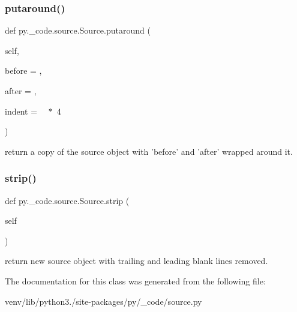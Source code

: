 \subsubsection{\texorpdfstring{putaround()}{putaround()}}
{\footnotesize\ttfamily def py.\+\_\+code.\+source.\+Source.\+putaround (\begin{DoxyParamCaption}\item[{}]{self,  }\item[{}]{before = {\ttfamily \textquotesingle{}\textquotesingle{}},  }\item[{}]{after = {\ttfamily \textquotesingle{}\textquotesingle{}},  }\item[{}]{indent = {\ttfamily \textquotesingle{}~\textquotesingle{}~$\ast$~4} }\end{DoxyParamCaption})}

\begin{DoxyVerb}return a copy of the source object with
    'before' and 'after' wrapped around it.
\end{DoxyVerb}
 \mbox{\label{classpy_1_1__code_1_1source_1_1_source_ac9490124c30cb66e50bb7e87dbdd029e}} 
\subsubsection{\texorpdfstring{strip()}{strip()}}
{\footnotesize\ttfamily def py.\+\_\+code.\+source.\+Source.\+strip (\begin{DoxyParamCaption}\item[{}]{self }\end{DoxyParamCaption})}

\begin{DoxyVerb}return new source object with trailing
    and leading blank lines removed.
\end{DoxyVerb}
 

The documentation for this class was generated from the following file\+:\begin{DoxyCompactItemize}
\item 
venv/lib/python3./site-\/packages/py/\+\_\+code/source.\+py\end{DoxyCompactItemize}
